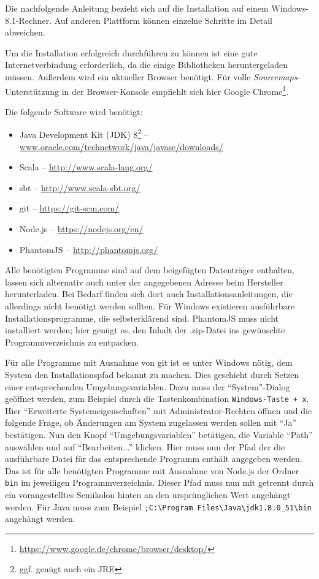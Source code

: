 \documentclass[a4paper, 12pt, hidelinks, listof=totoc, listoftables=totoc, bibliography=totoc]{scrreprt}
\begin{document}

Die nachfolgende Anleitung bezieht sich auf die Installation auf einem Windows-8.1-Rechner. Auf anderen Plattform können einzelne Schritte im Detail abweichen.

Um die Installation erfolgreich durchführen zu können ist eine gute Internetverbindung erforderlich, da die einige Bibliotheken heruntergeladen müssen. Außerdem wird ein aktueller Browser benötigt. Für volle \textit{Sourcemaps}-Unterstützung in der Browser-Konsole empfiehlt sich hier Google Chrome\footnote{\url{https://www.google.de/chrome/browser/desktop/}}.

Die folgende Software wird benötigt:

\begin{itemize}
	\item Java Development Kit (JDK) 8\footnote{ggf. genügt auch ein JRE}  --  \url{www.oracle.com/technetwork/java/javase/downloads/}
	\item Scala  --  \url{http://www.scala-lang.org/}
	\item sbt  --  \url{http://www.scala-sbt.org/}
	\item git  --  \url{https://git-scm.com/}
	\item Node.js  --  \url{https://nodejs.org/en/}
	\item PhantomJS  --  \url{http://phantomjs.org/}
\end{itemize}

Alle benötigten Programme sind auf dem beigefügten Datenträger enthalten, lassen sich alternativ auch unter der angegebenen Adresse beim Hersteller herunterladen. Bei Bedarf finden sich dort auch Installationsanleitungen, die allerdings nicht benötigt werden sollten. Für Windows existieren ausführbare Installationsprogramme, die selbsterklärend sind. PhantomJS muss nicht installiert werden; hier genügt es, den Inhalt der .zip-Datei ins gewünschte Programmverzeichnis zu entpacken.

Für alle Programme mit Ausnahme von git ist es unter Windows nötig, dem System den Installationspfad bekannt zu machen. Dies geschieht durch Setzen einer entsprechenden Umgebungsvariablen. Dazu muss der "`System"'-Dialog geöffnet werden, zum Beispiel durch die Tastenkombination \texttt{Windows-Taste + x}. Hier "`Erweiterte Systemeigenschaften"' mit Administrator-Rechten öffnen und die folgende Frage, ob Änderungen am System zugelassen werden sollen mit "`Ja"' bestätigen. Nun den Knopf "`Umgebungsvariablen"' betätigen, die Variable "`Path"' auswählen und auf "`Bearbeiten..."' klicken. Hier muss nun der Pfad der die ausführbare Datei für das entsprechende Programm enthält angegeben werden. Das ist für alle benötigten Programme mit Ausnahme von Node.js der Ordner \texttt{bin} im jeweiligen Programmverzeichnis. Dieser Pfad muss nun mit getrennt durch ein vorangestelltes Semikolon hinten an den ursprünglichen Wert angehängt werden. Für Java muss zum Beispiel \texttt{;C:\textbackslash{}Program Files\textbackslash{}Java\textbackslash{}jdk1.8.0\_51\textbackslash{}bin} angehängt werden.
\end{document}
